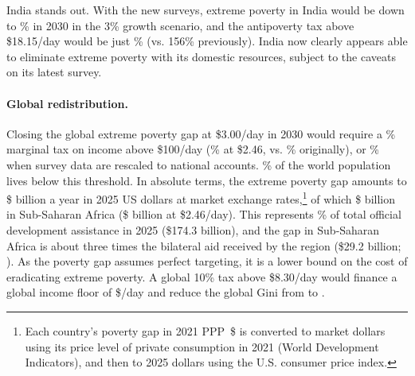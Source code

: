 India stands out. With the new surveys, extreme poverty in India would be down to \upRateThreeIND\% in 2030 in the 3\% growth scenario, and the antipoverty tax above \$18.15/day would be just \upTaxEighteenThreeIND\% (vs. 156\% previously). India now clearly appears able to eliminate extreme poverty with its domestic resources, subject to the caveats on its latest survey.

\paragraph{Global redistribution.} Closing the global extreme poverty gap at \$3.00/day in 2030 would require a \upRateHundred\% marginal tax on income above \$100/day (\upRateHundredEq\% at \$2.46, vs. \PaperRateHundred\% originally), or \upRateHundredHFCE\% when survey data are rescaled to national accounts. \upShareBelowHundred\% of the world population lives below this threshold. In absolute terms, the extreme poverty gap amounts to \$\upGapBnUSD{} billion a year in 2025 US dollars at market exchange rates,\footnote{Each country's poverty gap in 2021 PPP~\$ is converted to market dollars using its price level of private consumption in 2021 (World Development Indicators), and then to 2025 dollars using the U.S. consumer price index.} of which \$\upGapBnUSDSSA{} billion in Sub-Saharan Africa (\$\upGapBnUSDEq{} billion at \$2.46/day). This represents \upGapShareODA\% of total official development assistance in 2025 (\$174.3 billion), and the gap in Sub-Saharan Africa is about three times the bilateral aid received by the region (\$29.2 billion; \citealp{oecd_historic_2026}). As the poverty gap assumes perfect targeting, it is a lower bound on the cost of eradicating extreme poverty. A global 10\% tax above \$8.30/day would finance a global income floor of \$\upGlobalFloor/day and reduce the global Gini from \upGiniThree{} to \upGiniThreeGlobalTax.

